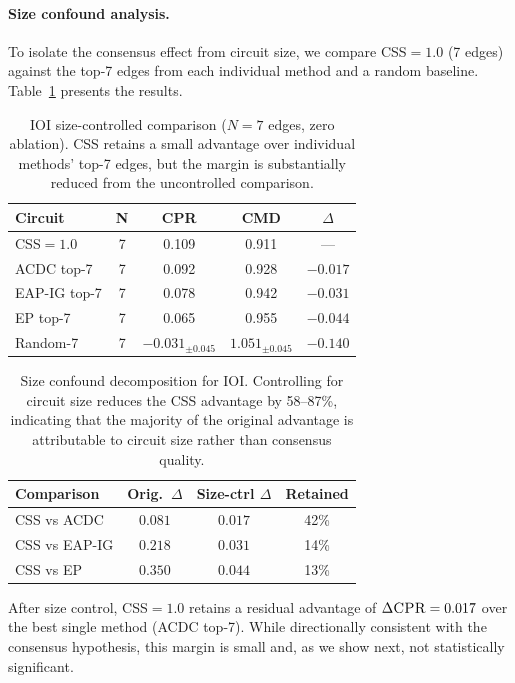 \documentclass[11pt,a4paper]{article}
\newcommand{\css}{\textsc{CSS}}
\newcommand{\cpr}{\textsc{CPR}}
\newcommand{\cmd}{\textsc{CMD}}
\begin{document}
\paragraph{Size confound analysis.}
\label{sec:size-confound}
To isolate the consensus effect from circuit size, we compare \css{}$=1.0$ (7 edges) against the top-7 edges from each individual method and a random baseline. Table~\ref{tab:ioi-size} presents the results.

\begin{table}[t]
\centering
\small
\begin{tabular}{lcccc}
\toprule
\textbf{Circuit} & \textbf{N} & \textbf{\cpr{}} & \textbf{\cmd{}} & \textbf{$\Delta$} \\
\midrule
\css{}$=1.0$ & 7 & 0.109 & 0.911 & --- \\
ACDC top-7 & 7 & 0.092 & 0.928 & $-0.017$ \\
EAP-IG top-7 & 7 & 0.078 & 0.942 & $-0.031$ \\
EP top-7 & 7 & 0.065 & 0.955 & $-0.044$ \\
Random-7 & 7 & $-0.031_{\pm 0.045}$ & $1.051_{\pm 0.045}$ & $-0.140$ \\
\bottomrule
\end{tabular}
\caption{IOI size-controlled comparison ($N=7$ edges, zero ablation). \css{} retains a small advantage over individual methods' top-7 edges, but the margin is substantially reduced from the uncontrolled comparison.}
\label{tab:ioi-size}
\end{table}

\begin{table}[t]
\centering
\small
\begin{tabular}{lccc}
\toprule
\textbf{Comparison} & \textbf{Orig.~$\Delta$} & \textbf{Size-ctrl $\Delta$} & \textbf{Retained} \\
\midrule
CSS vs ACDC & $0.081$ & $0.017$ & 42\% \\
CSS vs EAP-IG & $0.218$ & $0.031$ & 14\% \\
CSS vs EP & $0.350$ & $0.044$ & 13\% \\
\bottomrule
\end{tabular}
\caption{Size confound decomposition for IOI. Controlling for circuit size reduces the \css{} advantage by 58--87\%, indicating that the majority of the original advantage is attributable to circuit size rather than consensus quality.}
\label{tab:size-decomp}
\end{table}

After size control, \css{}$=1.0$ retains a residual advantage of $\Delta\cpr{}=0.017$ over the best single method (ACDC top-7). While directionally consistent with the consensus hypothesis, this margin is small and, as we show next, not statistically significant.
\end{document}

